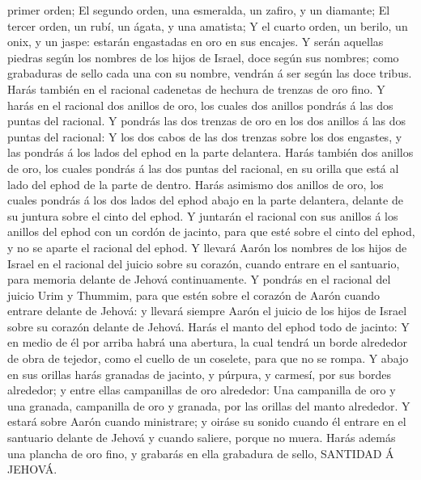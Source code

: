 primer orden;  El segundo orden, una esmeralda, un
zafiro, y un diamante;  El tercer orden, un rubí, un
ágata, y una amatista;  Y el cuarto orden, un berilo, un
onix, y un jaspe: estarán engastadas en oro en sus encajes.
 Y serán aquellas piedras según los nombres de los hijos
de Israel, doce según sus nombres; como grabaduras de sello cada una con
su nombre, vendrán á ser según las doce tribus.  Harás
también en el racional cadenetas de hechura de trenzas de oro fino.
 Y harás en el racional dos anillos de oro, los cuales
dos anillos pondrás á las dos puntas del racional.  Y
pondrás las dos trenzas de oro en los dos anillos á las dos puntas del
racional:  Y los dos cabos de las dos trenzas sobre los
dos engastes, y las pondrás á los lados del ephod en la parte delantera.
 Harás también dos anillos de oro, los cuales pondrás á
las dos puntas del racional, en su orilla que está al lado del ephod de
la parte de dentro.  Harás asimismo dos anillos de oro,
los cuales pondrás á los dos lados del ephod abajo en la parte
delantera, delante de su juntura sobre el cinto del ephod.
 Y juntarán el racional con sus anillos á los anillos del
ephod con un cordón de jacinto, para que esté sobre el cinto del ephod,
y no se aparte el racional del ephod.  Y llevará Aarón
los nombres de los hijos de Israel en el racional del juicio sobre su
corazón, cuando entrare en el santuario, para memoria delante de Jehová
continuamente.  Y pondrás en el racional del juicio Urim
y Thummim, para que estén sobre el corazón de Aarón cuando entrare
delante de Jehová: y llevará siempre Aarón el juicio de los hijos de
Israel sobre su corazón delante de Jehová.  Harás el
manto del ephod todo de jacinto:  Y en medio de él por
arriba habrá una abertura, la cual tendrá un borde alrededor de obra de
tejedor, como el cuello de un coselete, para que no se rompa.
 Y abajo en sus orillas harás granadas de jacinto, y
púrpura, y carmesí, por sus bordes alrededor; y entre ellas campanillas
de oro alrededor:  Una campanilla de oro y una granada,
campanilla de oro y granada, por las orillas del manto alrededor.
 Y estará sobre Aarón cuando ministrare; y oiráse su
sonido cuando él entrare en el santuario delante de Jehová y cuando
saliere, porque no muera.  Harás además una plancha de
oro fino, y grabarás en ella grabadura de sello, SANTIDAD Á JEHOVÁ.

